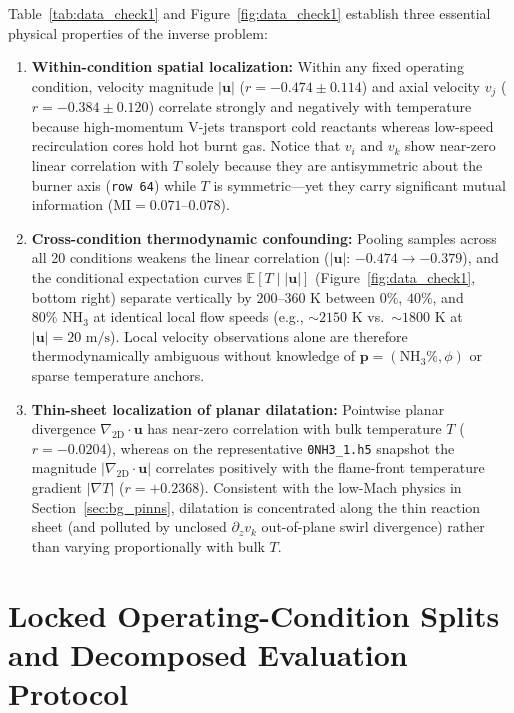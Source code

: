 Table~\ref{tab:data_check1} and Figure~\ref{fig:data_check1} establish three essential physical properties of the inverse problem:
\begin{enumerate}
    \item \textbf{Within-condition spatial localization:} Within any fixed operating condition, velocity magnitude $|\mathbf{u}|$ ($r = -0.474 \pm 0.114$) and axial velocity $v_j$ ($r = -0.384 \pm 0.120$) correlate strongly and negatively with temperature because high-momentum V-jets transport cold reactants whereas low-speed recirculation cores hold hot burnt gas. Notice that $v_i$ and $v_k$ show near-zero linear correlation with $T$ solely because they are antisymmetric about the burner axis (\texttt{row 64}) while $T$ is symmetric---yet they carry significant mutual information ($\text{MI} = 0.071\text{--}0.078$).
    \item \textbf{Cross-condition thermodynamic confounding:} Pooling samples across all 20 conditions weakens the linear correlation ($|\mathbf{u}|$: $-0.474 \rightarrow -0.379$), and the conditional expectation curves $\mathbb{E}[T \mid |\mathbf{u}|]$ (Figure~\ref{fig:data_check1}, bottom right) separate vertically by \textbf{$200\text{--}360\text{ K}$} between $0\%$, $40\%$, and $80\%\text{ NH}_3$ at identical local flow speeds (e.g., $\sim 2150\text{ K}$ vs.\ $\sim 1800\text{ K}$ at $|\mathbf{u}| = 20\text{ m/s}$). Local velocity observations alone are therefore thermodynamically ambiguous without knowledge of $\mathbf{p} = (\text{NH}_3\%, \phi)$ or sparse temperature anchors.
    \item \textbf{Thin-sheet localization of planar dilatation:} Pointwise planar divergence $\nabla_{\text{2D}}\cdot\mathbf{u}$ has near-zero correlation with bulk temperature $T$ ($r = -0.0204$), whereas on the representative \texttt{0NH3\_1.h5} snapshot the magnitude $|\nabla_{\text{2D}}\cdot\mathbf{u}|$ correlates positively with the flame-front temperature gradient $|\nabla T|$ ($r = +0.2368$). Consistent with the low-Mach physics in Section~\ref{sec:bg_pinns}, dilatation is concentrated along the thin reaction sheet (and polluted by unclosed $\partial_z v_k$ out-of-plane swirl divergence) rather than varying proportionally with bulk $T$.
\end{enumerate}

\section{Locked Operating-Condition Splits and Decomposed Evaluation Protocol}
\label{sec:data_protocol}

